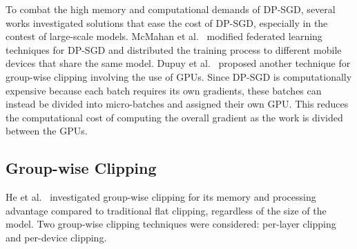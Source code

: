 To combat the high memory and computational demands of DP-SGD, several works investigated solutions that ease the cost of DP-SGD, especially in the contest of large-scale models.  McMahan et al.~\cite{RefWorks:RefID:45-mcmahan2018learning} modified federated learning techniques for DP-SGD and distributed the training process to different mobile devices that share the same model. Dupuy et al.~\cite{RefWorks:RefID:43-dupuy2022efficient} proposed another technique for group-wise clipping involving the use of GPUs. Since DP-SGD is computationally expensive because each batch requires its own gradients, these batches can instead be divided into micro-batches and assigned their own GPU. This reduces the computational cost of computing the overall gradient as the work is divided between the GPUs. %


\subsection{Group-wise Clipping}

He et al.~\cite{RefWorks:RefID:39-he2022exploring} investigated group-wise clipping for its memory and processing advantage compared to traditional flat clipping, regardless of the size of the model. Two group-wise clipping techniques were considered: per-layer clipping and per-device clipping.

